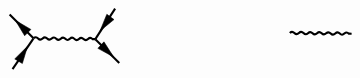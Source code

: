\begin{equation}
\begin{tikzpicture}[x=0.65pt,y=0.65pt,yscale=-1,xscale=1]
\draw [line width=1.5]    (223.46,533.64) .. controls (225.15,531.99) and (226.81,532.01) .. (228.46,533.7) .. controls (230.11,535.39) and (231.77,535.41) .. (233.46,533.77) .. controls (235.15,532.12) and (236.81,532.14) .. (238.46,533.83) .. controls (240.11,535.52) and (241.77,535.54) .. (243.46,533.9) .. controls (245.15,532.25) and (246.81,532.27) .. (248.46,533.96) .. controls (250.11,535.65) and (251.77,535.67) .. (253.46,534.03) .. controls (255.15,532.38) and (256.81,532.4) .. (258.46,534.09) .. controls (260.11,535.78) and (261.77,535.8) .. (263.46,534.15) .. controls (265.15,532.51) and (266.81,532.53) .. (268.46,534.22) .. controls (270.11,535.91) and (271.77,535.93) .. (273.46,534.28) .. controls (275.15,532.64) and (276.81,532.66) .. (278.45,534.35) .. controls (280.1,536.04) and (281.76,536.06) .. (283.45,534.41) .. controls (285.14,532.77) and (286.8,532.79) .. (288.45,534.48) -- (291.45,534.52) -- (291.45,534.52) ;
\draw [line width=1.5]    (197.13,507.46) -- (223.46,533.64) ;
\draw [line width=1.5]    (291.45,534.52) -- (317.78,560.69) ;
\draw [line width=1.5]    (223.46,533.64) -- (200.35,567.51) ;
\draw [line width=1.5]    (313.22,500.96) -- (291.45,534.52) ;
\draw  [fill={rgb, 255:red, 0; green, 0; blue, 0 }  ,fill opacity=1 ] (203.47,513.82) -- (220.54,523.81) -- (213.69,530.75) -- cycle ;
\draw  [fill={rgb, 255:red, 0; green, 0; blue, 0 }  ,fill opacity=1 ] (311.63,554.14) -- (294.29,544.63) -- (300.94,537.5) -- cycle ;
\draw  [fill={rgb, 255:red, 0; green, 0; blue, 0 }  ,fill opacity=1 ] (296.64,525.44) -- (304.12,507.14) -- (311.96,512.94) -- cycle ;
\draw  [fill={rgb, 255:red, 0; green, 0; blue, 0 }  ,fill opacity=1 ] (216.85,542.36) -- (211.15,561.3) -- (202.79,556.27) -- cycle ;
\draw [line width=1.5]    (505.46,527.64) .. controls (507.15,525.99) and (508.81,526.01) .. (510.46,527.7) .. controls (512.11,529.39) and (513.77,529.41) .. (515.46,527.77) .. controls (517.15,526.12) and (518.81,526.14) .. (520.46,527.83) .. controls (522.11,529.52) and (523.77,529.54) .. (525.46,527.9) .. controls (527.15,526.25) and (528.81,526.27) .. (530.46,527.96) .. controls (532.11,529.65) and (533.77,529.67) .. (535.46,528.03) .. controls (537.15,526.38) and (538.81,526.4) .. (540.46,528.09) .. controls (542.11,529.78) and (543.77,529.8) .. (545.46,528.15) .. controls (547.15,526.51) and (548.81,526.53) .. (550.46,528.22) .. controls (552.11,529.91) and (553.77,529.93) .. (555.46,528.28) .. controls (557.15,526.64) and (558.81,526.66) .. (560.45,528.35) .. controls (562.1,530.04) and (563.76,530.06) .. (565.45,528.41) .. controls (567.14,526.77) and (568.8,526.79) .. (570.45,528.48) -- (573.45,528.52) -- (573.45,528.52) ;

\end{tikzpicture}
\end{equation}
